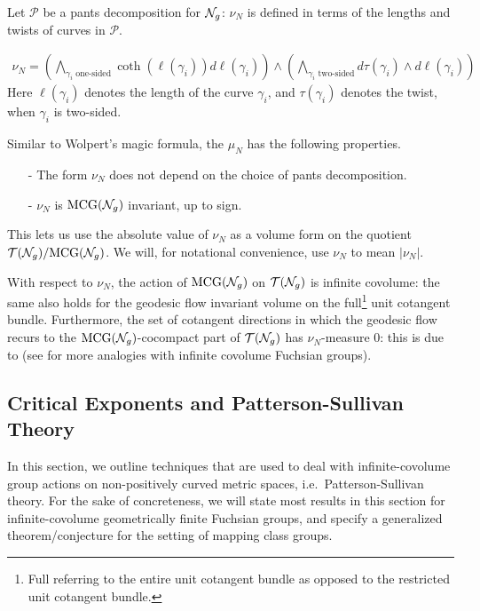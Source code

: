 Let $\mathcal{P}$ be a pants decomposition for $\mathcal{N}_g$: $\nu_N$ is defined in terms of the lengths and twists of curves in $\mathcal{P}$.

\begin{align*}
  \nu_N = \left( \bigwedge_{\text{$\gamma_i$ one-sided}} \coth(\ell(\gamma_i)) d\ell(\gamma_i) \right) \wedge \left( \bigwedge_{\text{$\gamma_i$ two-sided}} d\tau(\gamma_i) \wedge d\ell(\gamma_i) \right)
\end{align*}
Here $\ell(\gamma_i)$ denotes the length of the curve $\gamma_i$, and $\tau(\gamma_i)$ denotes the twist, when $\gamma_i$ is two-sided.

Similar to Wolpert's magic formula, the $\mu_N$ has the following properties.
\begin{itemize}
\item[-] The form $\nu_N$ does not depend on the choice of pants decomposition.
\item[-] $\nu_N$ is $\mathrm{MCG}(\mathcal{N}_g)$ invariant, up to sign.
\end{itemize}
This lets us use the absolute value of $\nu_N$ as a volume form on the quotient $\mathcal{T}(\mathcal{N}_g) / \mathrm{MCG}(\mathcal{N}_g)$.
We will, for notational convenience, use $\nu_N$ to mean $\left| \nu_N \right|$.

With respect to $\nu_N$, the action of $\mathrm{MCG}(\mathcal{N}_g)$ on $\mathcal{T}(\mathcal{N}_g)$ is infinite covolume: the same also holds for the geodesic flow invariant volume on the full\footnote{Full referring to the entire unit cotangent bundle as opposed to the restricted unit cotangent bundle.} unit cotangent bundle.
Furthermore, the set of cotangent directions in which the geodesic flow recurs to the $\mathrm{MCG}(\mathcal{N}_g)$-cocompact part of $\mathcal{T}(\mathcal{N}_g)$ has $\nu_N$-measure $0$: this is due to \textcite{norbury2008lengths} (see \textcite{gendulphe2017whats} for more analogies with infinite covolume Fuchsian groups).

\subsection{Critical Exponents and Patterson-Sullivan Theory}
\label{sec:crit-expon-patt}

In this section, we outline techniques that are used to deal with infinite-covolume group actions on non-positively curved metric spaces, i.e.\ Patterson-Sullivan theory.
For the sake of concreteness, we will state most results in this section for infinite-covolume geometrically finite Fuchsian groups, and specify a generalized theorem/conjecture for the setting of mapping class groups.

